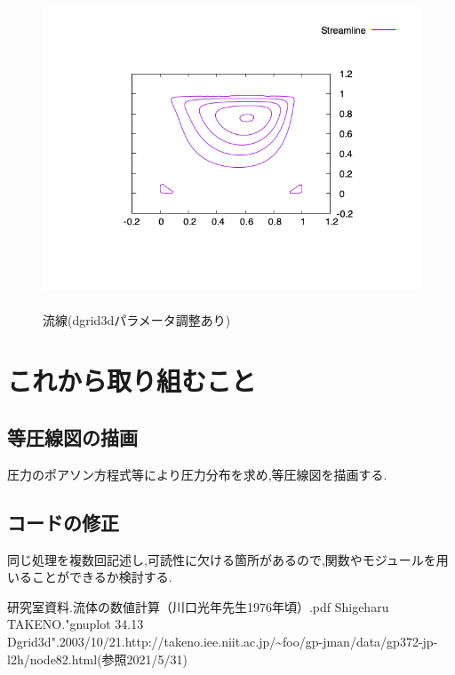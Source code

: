 \documentclass[upLaTeX,a4paper]{jsarticle}
\begin{document}
\begin{figure}[H]
  \centering
  \includegraphics[height=9.5cm]{outputs/img/stream_line.png}
  \caption{流線(dgrid3dパラメータ調整あり)}
  \label{fig:stream_line}
\end{figure}
\section{これから取り組むこと}
\subsection{等圧線図の描画}
圧力のポアソン方程式等により圧力分布を求め,等圧線図を描画する.

\subsection{コードの修正}
同じ処理を複数回記述し,可読性に欠ける箇所があるので,関数やモジュールを用いることができるか検討する.

\begin{thebibliography}{9}
   研究室資料.流体の数値計算（川口光年先生1976年頃）.pdf
   Shigeharu TAKENO."gnuplot 34.13 Dgrid3d".2003/10/21.http://takeno.iee.niit.ac.jp/\textasciitilde foo/gp-jman/data/gp372-jp-l2h/node82.html(参照2021/5/31)

\end{thebibliography}
\end{document}
